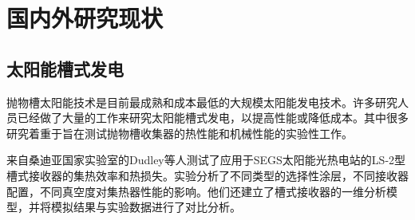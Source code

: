 \section{国内外研究现状}

\subsection{太阳能槽式发电}

抛物槽太阳能技术是目前最成熟和成本最低的大规模太阳能发电技术\cite{Price2002}。许多研究人员已经做了大量的工作来研究太阳能槽式发电，以提高性能或降低成本。其中很多研究着重于旨在测试抛物槽收集器的热性能和机械性能的实验性工作。

来自桑迪亚国家实验室的Dudley等人\cite{Dudley1994}测试了应用于SEGS太阳能光热电站的LS-2型槽式接收器的集热效率和热损失。实验分析了不同类型的选择性涂层，不同接收器配置，不同真空度对集热器性能的影响。他们还建立了槽式接收器的一维分析模型，并将模拟结果与实验数据进行了对比分析。

